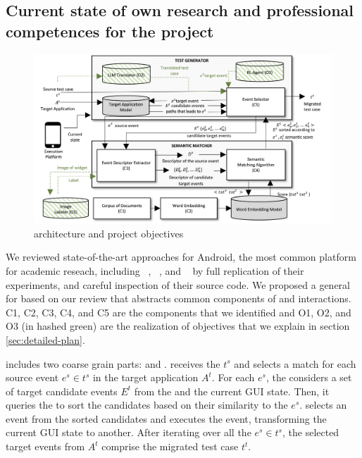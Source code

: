 	
\subsection{Current state of own research and professional competences for the project}
\label{sec:own-research}

\begin{figure}[h]
	\centering
	\includegraphics[width=\textwidth]{images/architecture.png}
	\caption{\testreuse architecture and project objectives}
	\label{fig:architecture}
\end{figure}

We reviewed state-of-the-art \testreuse approaches for Android, the most common platform for academic reseach, including \atm~\cite{behrang:apptestmigrator:ASE:2019}, \craftdroid~\cite{lin:craftdroid:ASE:2019}, and \adaptdroid~\cite{Mariani:Adaptdroid:AST:2021} by full replication of their experiments, and careful inspection of their source code.
We proposed a general \architecture for \testreuse based on our review that abstracts common components of \testreuse  and interactions. 
C1, C2, C3, C4, and C5 are the components that we identified and O1, O2, and O3 (in hashed green) are the realization of \project objectives that we explain in section \ref{sec:detailed-plan}. 


\smallskip 
\testreuse  includes two coarse grain parts: \generator and \matcher.
\generator receives the $t^s$ and selects a match for each source event $e^s \in t^s$ in the target application $A^t$.
For each $e^s$, the \generator considers a set of target candidate events $E^t$ from the \tam and the current GUI state. 
Then, it queries the \matcher to sort the candidates based on their similarity to the $e^s$.
\generator selects an event from the sorted candidates and executes the event, transforming the current GUI state to another. 
After iterating over all the $e^s \in t^s$, the selected target events from $A^t$ comprise the migrated test case $t^t$. 



